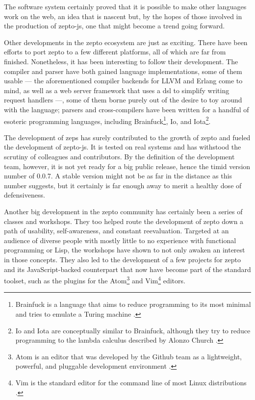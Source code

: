 \documentclass[oneside,11pt,xetex]{scrbook}
\begin{document}
The software system certainly proved that it is possible to make other
languages work on the web, an idea that is nascent but, by the hopes of
those involved in the production of zepto-js, one that might become a trend
going forward.

Other developments in the zepto ecosystem are just as exciting. There have
been efforts to port zepto to a few different platforms, all of which are
far from finished. Nonetheless, it has been interesting to follow their development.
The compiler and parser have both gained language implementations, some of
them usable --- the aforementioned compiler backends for LLVM and Erlang come to
mind, as well as a web server framework that uses a \gls{dsl} to simplify writing
request handlers ---, some of them borne purely out of the desire to toy around
with the language; parsers and cross-compilers have been written for a handful of
esoteric programming languages, including Brainfuck\footnote{Brainfuck is a language
that aims to reduce programming to its most minimal and tries to emulate a Turing
machine \parencite{BFK}.}, Io, and Iota\footnote{Io and Iota are conceptually similar
to Brainfuck, although they try to reduce programming to the lambda calculus described
by Alonzo Church \parencite{IOT}.}.

The development of \gls{zeps} has surely contributed to the growth of zepto and
fueled the development of zepto-js. It is tested on real systems and has
withstood the scrutiny of colleagues and contributors. By the definition of the
development team, however, it is not yet ready for a big public release, hence
the timid version number of 0.0.7. A stable version might not be as far in the
distance as this number suggests, but it certainly is far enough away to merit
a healthy dose of defensiveness.

Another big development in the zepto community has certainly been a series of
classes and workshops. They too helped route the development of zepto down
a path of usability, self-awareness, and constant reevaluation. Targeted at an
audience of diverse people with mostly little to no experience with functional
programming or Lisp, the workshops have shown to not only awaken an interest in those
concepts. They also led to the development of a few projects for zepto and its
JavaScript-backed counterpart that now have become part of the standard toolset,
such as the plugins for the Atom\footnote{Atom is an editor that was developed by
the Github team as a lightweight, powerful, and pluggable development environment
\parencite{ATOM}.} and Vim\footnote{Vim is the standard editor for the command line
of most Linux distributions \parencite{VIM}.} editors.
\end{document}
